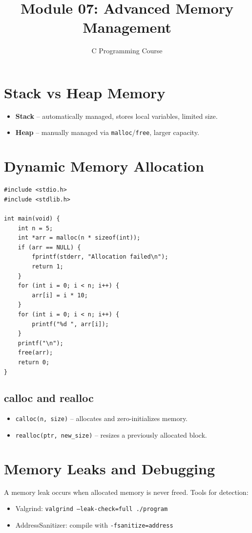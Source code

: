 \documentclass[11pt,a4paper]{article}
\title{Module 07: Advanced Memory Management}
\author{C Programming Course}
\date{}
\begin{document}
\maketitle
\thispagestyle{fancy}

\section{Stack vs Heap Memory}
\begin{itemize}
  \item \textbf{Stack} -- automatically managed, stores local variables, limited size.
  \item \textbf{Heap} -- manually managed via \texttt{malloc}/\texttt{free}, larger capacity.
\end{itemize}

\section{Dynamic Memory Allocation}
\begin{lstlisting}
#include <stdio.h>
#include <stdlib.h>

int main(void) {
    int n = 5;
    int *arr = malloc(n * sizeof(int));
    if (arr == NULL) {
        fprintf(stderr, "Allocation failed\n");
        return 1;
    }
    for (int i = 0; i < n; i++) {
        arr[i] = i * 10;
    }
    for (int i = 0; i < n; i++) {
        printf("%d ", arr[i]);
    }
    printf("\n");
    free(arr);
    return 0;
}
\end{lstlisting}

\subsection{calloc and realloc}
\begin{itemize}
  \item \texttt{calloc(n, size)} -- allocates and zero-initializes memory.
  \item \texttt{realloc(ptr, new\_size)} -- resizes a previously allocated block.
\end{itemize}

\section{Memory Leaks and Debugging}
A memory leak occurs when allocated memory is never freed. Tools for detection:
\begin{itemize}
  \item Valgrind: \texttt{valgrind --leak-check=full ./program}
  \item AddressSanitizer: compile with \texttt{-fsanitize=address}
\end{itemize}
\end{document}

